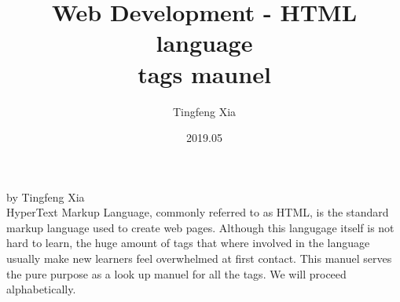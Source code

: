 \documentclass[oneside, 12pt]{article}
\title{%
  \textbf{Web Development - HTML language}\\
  \large tags maunel}
\author{Tingfeng Xia}
\date{2019.05}
\begin{document}
\maketitle
\newpage %
\mbox{}
\vfill
\noindent by Tingfeng Xia \\


\noindent HyperText Markup Language, commonly referred to as HTML, 
is the standard markup language used to create web pages. Although this langugage itself
is not hard to learn, the huge amount of tags that where involved in the language usually make
new learners feel overwhelmed at first contact. This manuel serves the pure purpose as a 
look up manuel for all the tags. We will proceed alphabetically.

\doclicenseThis
\newpage
\end{document}
